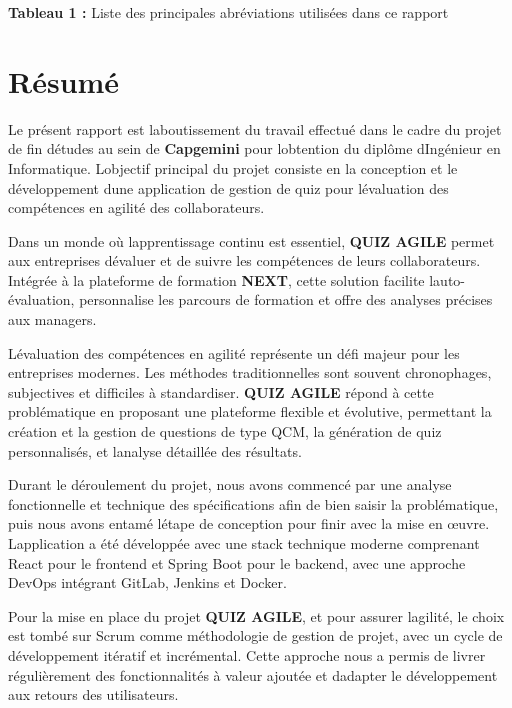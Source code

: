 \documentclass[12pt,a4paper,twoside]{report}
\begin{document}
\begin{center}
\textcolor{capgeminiblue}{\textbf{Tableau 1 :}} Liste des principales abréviations utilisées dans ce rapport
\end{center}

\chapter{Résumé}

Le présent rapport est l\textquotesingle aboutissement du travail
effectué dans le cadre du projet de fin d\textquotesingle études au sein
de \textbf{Capgemini} pour l\textquotesingle obtention du diplôme
d\textquotesingle Ingénieur en Informatique. L\textquotesingle objectif
principal du projet consiste en la conception et le développement
d\textquotesingle une application de gestion de quiz pour
l\textquotesingle évaluation des compétences en agilité des
collaborateurs.

Dans un monde où l\textquotesingle apprentissage continu est essentiel,
\textbf{QUIZ AGILE} permet aux entreprises d\textquotesingle évaluer et
de suivre les compétences de leurs collaborateurs. Intégrée à la
plateforme de formation \textbf{NEXT}, cette solution facilite
l\textquotesingle auto-évaluation, personnalise les parcours de
formation et offre des analyses précises aux managers.

L\textquotesingle évaluation des compétences en agilité représente un
défi majeur pour les entreprises modernes. Les méthodes traditionnelles
sont souvent chronophages, subjectives et difficiles à standardiser.
\textbf{QUIZ AGILE} répond à cette problématique en proposant une
plateforme flexible et évolutive, permettant la création et la gestion
de questions de type QCM, la génération de quiz personnalisés, et
l\textquotesingle analyse détaillée des résultats.

Durant le déroulement du projet, nous avons commencé par une analyse
fonctionnelle et technique des spécifications afin de bien saisir la
problématique, puis nous avons entamé l\textquotesingle étape de
conception pour finir avec la mise en œuvre.
L\textquotesingle application a été développée avec une stack technique
moderne comprenant React pour le frontend et Spring Boot pour le
backend, avec une approche DevOps intégrant GitLab, Jenkins et Docker.

Pour la mise en place du projet \textbf{QUIZ AGILE}, et pour assurer
l\textquotesingle agilité, le choix est tombé sur Scrum comme
méthodologie de gestion de projet, avec un cycle de développement
itératif et incrémental. Cette approche nous a permis de livrer
régulièrement des fonctionnalités à valeur ajoutée et
d\textquotesingle adapter le développement aux retours des utilisateurs.
\end{document}
